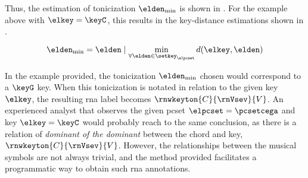 Thus, the estimation of tonicization $\elden_{\min}$ is
shown in . For the example
above with $\elkey = \keyC$, this results in the
key-distance estimations shown in
.

\begin{equation}
    \label{eq:tonicization_estimation}
    \elden_{\min} = \elden \mid \min_{\forall \elden \in \setkey_\elpcset} d(\elkey, \elden)
\end{equation}


In the example provided, the tonicization $\elden_{\min}$
chosen would correspond to a $\keyG$ key. When this
tonicization is notated in relation to the given key
$\elkey$, the resulting \gls{rna} label becomes
$\rnwkeyton{C}{\rnVsev}{V}$. An experienced analyst that
observes the given \gls{pcset} $\elpcset = \pcsetcega$ and
key $\elkey = \keyC$ would probably reach to the same
conclusion, as there is a relation of \emph{dominant of the
dominant} between the chord and key,
$\rnwkeyton{C}{\rnVsev}{V}$. However, the relationships
between the musical symbols are not always trivial, and the
method provided facilitates a programmatic way to obtain
such \gls{rna} annotations.
